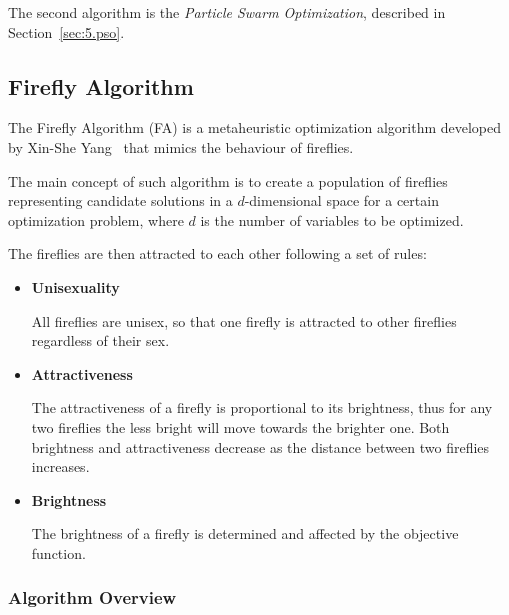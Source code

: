 The second algorithm is the \textit{Particle Swarm Optimization},
described in Section~\ref{sec:5.pso}.


\subsection{Firefly Algorithm}
\label{sec:5.fa}

The Firefly Algorithm (FA) is a metaheuristic optimization algorithm
developed by Xin-She Yang~\cite{yang2010nature} that mimics the behaviour
of fireflies.

The main concept of such algorithm is to create a population of fireflies
representing candidate solutions in a $d$-dimensional space 
for a certain optimization problem, where $d$ is the number of variables to be optimized.

The fireflies are then attracted to each other following a set of rules:

\begin{itemize}[noitemsep]
	\item \textbf{Unisexuality} 
	
	All fireflies are unisex, so that one firefly is attracted
	to other fireflies regardless of their sex.
	\item \textbf{Attractiveness}
	
	The attractiveness of a firefly is proportional to its brightness,
	thus for any two fireflies the less bright will move towards the brighter one.
	Both brightness and attractiveness decrease as the distance between
	two fireflies increases.
	\item \textbf{Brightness}
	
	The brightness of a firefly is determined and affected by the objective function.
\end{itemize}


\subsubsection{Algorithm Overview}

